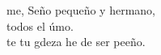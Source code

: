 \begin{cancion}%
	me, Seño pequeño y hermano,\\
	 todos el úmo.\\
	te tu gdeza he de ser peeño.\\
\end{cancion}%
